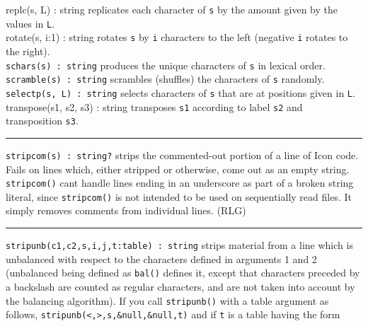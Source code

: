 \textsf{replc(s, L) : string} replicates each character of \texttt{s} by
the amount given by the values in \texttt{L}.\\
\textsf{rotate(s, i:1) : string} rotates \texttt{s} by \texttt{i}
characters to the left (negative \texttt{i} rotates to the
right).\\
\texttt{schars(s) : string} produces the unique characters of \texttt{s}
in lexical order.\\
\texttt{scramble(s) : string} scrambles (shuffles) the characters of
\texttt{s} randomly.\\
\texttt{selectp(s, L) : string} selects characters of \texttt{s} that
are at positions given in \texttt{L}.\\
\textsf{transpose(s1, s2, s3) : string} transposes \texttt{s1} according
to label \texttt{s2} and transposition \texttt{s3}.

\vspace{0.25cm}\hrule{}

\texttt{stripcom(s) : string?} strips the commented-out portion of a
line of Icon code. Fails on lines which, either stripped or otherwise,
come out as an empty string. \texttt{stripcom()} can{\textquotesingle}t
handle lines ending in an underscore as part of a broken string
literal, since \texttt{stripcom()} is not intended to be used on
sequentially read files. It simply removes comments from
individual lines. (RLG)

\vspace{0.25cm}\hrule{}

\texttt{stripunb(c1,c2,s,i,j,t:table) : string} strips material from a
line which is unbalanced with respect to the characters defined in
arguments 1 and 2 (unbalanced being defined as \texttt{bal()} defines
it, except that characters preceded by a backslash are counted as
regular characters, and are not taken into account by the balancing
algorithm). If you call \texttt{stripunb()} with a table argument as
follows,
\texttt{stripunb({\textquotesingle}{\textless}{\textquotesingle},{\textquotesingle}{\textgreater}{\textquotesingle},s,\&null,\&null,t)}
and if \texttt{t} is a table having the form

\iconcode{
key: {\textquotedbl}bold{\textquotedbl} value:
outstr({\textquotedbl}{\textbackslash}e[2m{\textquotedbl},
{\textquotedbl}{\textbackslash}e1m{\textquotedbl})}

